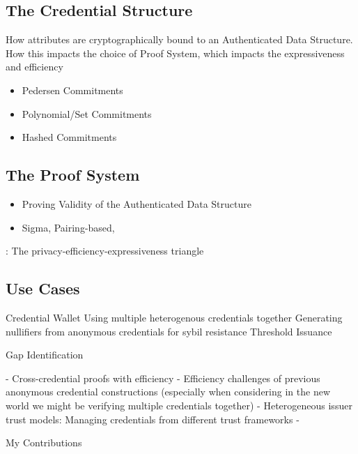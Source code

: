 \subsection{The Credential Structure}
How attributes are cryptographically bound to an Authenticated Data Structure.
How this impacts the choice of Proof System, which impacts the expressiveness and efficiency
\begin{itemize}
    \item Pedersen Commitments
    \item Polynomial/Set Commitments
    \item Hashed Commitments 
\end{itemize}


\subsection{The Proof System}
\begin{itemize}
    \item Proving Validity of the Authenticated Data Structure
    \item Sigma, Pairing-based, 
\end{itemize}

: The privacy-efficiency-expressiveness triangle


\subsection{Use Cases}

Credential Wallet
Using multiple heterogenous credentials together
Generating nullifiers from anonymous credentials for sybil resistance
Threshold Issuance

Gap Identification

- Cross-credential proofs with efficiency
- Efficiency challenges of previous anonymous credential constructions (especially when considering in the new world we might be verifying multiple credentials together)
- Heterogeneous issuer trust models: Managing credentials from different trust frameworks
- 


My Contributions

